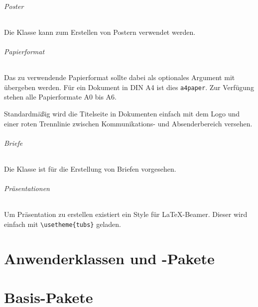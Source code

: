 \documentclass[a4paper,11pt,twoside=false,rgb,extramargin]{tubsbook}
\begin{document}
\paragraph{Poster}
Die Klasse  kann zum Erstellen von Postern verwendet werden.

\paragraph{Papierformat}
Das zu verwendende Papierformat sollte dabei als optionales Argument mit
übergeben werden. Für ein Dokument in DIN A4 ist dies \texttt{a4paper}.
Zur Verfügung stehen alle Papierformate A0 bis A6.

Standardmäßig wird die Titelseite in Dokumenten einfach mit dem Logo und einer
roten Trennlinie zwischen Kommunikations- und Absenderbereich versehen.

\paragraph{Briefe}

Die Klasse  ist für die Erstellung von Briefen
vorgesehen.

\paragraph{Präsentationen}
Um Präsentation zu erstellen existiert ein Style für \LaTeX-Beamer.
Dieser wird einfach mit \lstinline!\usetheme{tubs}! geladen.

\part{Anwenderklassen und -Pakete}







\part{Basis-Pakete}
\end{document}
